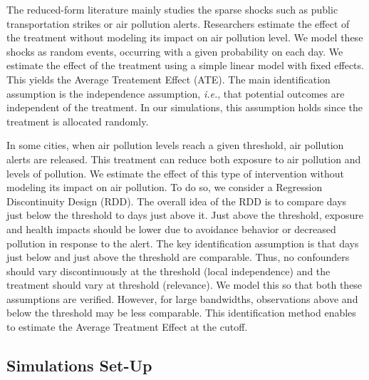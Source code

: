 \documentclass[12pt]{article}
\begin{document}
        The reduced-form literature mainly studies the sparse shocks such as public transportation strikes or air pollution alerts. Researchers estimate the effect of the treatment without modeling its impact on air pollution level. We model these shocks as random events, occurring with a given probability on each day. %
        We estimate the effect of the treatment using a simple linear model with fixed effects. This yields the Average Treatement Effect (ATE).%
        The main identification assumption is the independence assumption, \textit{i.e.}, that potential outcomes are independent of the treatment. In our simulations, this assumption holds since the treatment is allocated randomly. 
        
        In some cities, when air pollution levels reach a given threshold, air pollution alerts are released. This treatment can reduce both exposure to air pollution and levels of pollution. We estimate the effect of this type of intervention without modeling its impact on air pollution. To do so, we consider a Regression Discontinuity Design (RDD). The overall idea of the RDD is to compare days just below the threshold to days just above it. Just above the threshold, exposure and health impacts should be lower due to avoidance behavior or decreased pollution in response to the alert. The key identification assumption is that days just below and just above the threshold are comparable. Thus, no confounders should vary discontinuously at the threshold (local independence) and the treatment should vary at threshold (relevance). We model this so that both these assumptions are verified. However, for large bandwidths, observations above and below the threshold may be less comparable. This identification method enables to estimate the Average Treatment Effect at the cutoff.
        
    \subsection{Simulations Set-Up}\label{sec:sim_set_up}
    
\end{document}
